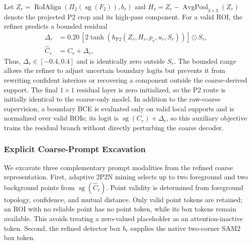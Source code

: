 \documentclass[letterpaper,journal]{IEEEtran}
\begin{document}
Let $Z_r=\operatorname{RoIAlign}(\Pi_2(\operatorname{sg}(F_2)),b_r)$ and $H_r=Z_r-\operatorname{AvgPool}_{3\times3}(Z_r)$ denote the projected P2 crop and its high-pass component. For a valid ROI, the refiner predicts a bounded residual
\begin{equation}
\begin{aligned}
\Delta_r&=0.20\,[2\tanh(h_{\mathrm{P2}}(
Z_r,H_r,p_r,u_r,S_r))]\odot S_r,\\
\widehat{C}_r&=C_r+\Delta_r,
\end{aligned}
\label{eq:p2_refinement}
\end{equation}
Thus, $\Delta_r\in[-0.4,0.4]$ and is identically zero outside $S_r$. The bounded range allows the refiner to adjust uncertain boundary logits but prevents it from rewriting confident interiors or recovering a component outside the coarse-derived support. The final $1\times1$ residual layer is zero initialized, so the P2 route is initially identical to the coarse-only model. In addition to the raw-coarse supervision, a boundary BCE is evaluated only on valid local supports and is normalized over valid ROIs; its logit is $\operatorname{sg}(C_r)+\Delta_r$, so this auxiliary objective trains the residual branch without directly perturbing the coarse decoder.

\subsubsection{Explicit Coarse-Prompt Excavation}
We excavate three complementary prompt modalities from the refined coarse representation. First, adaptive 2P2N mining selects up to two foreground and two background points from $\operatorname{sg}(\widehat{C}_r)$. Point validity is determined from foreground topology, confidence, and mutual distance. Only valid point tokens are retained; an ROI with no reliable point has no point token, while its box tokens remain available. This avoids treating a zero-valued placeholder as an attention-inactive token. Second, the refined detector box $b_r$ supplies the native two-corner SAM2 box token.
\end{document}
